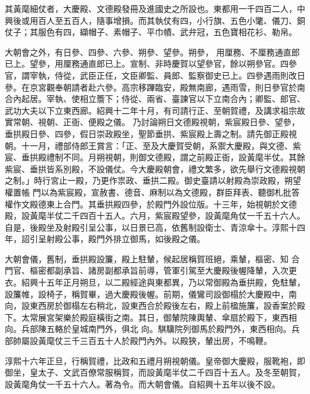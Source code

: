 \begin{pinyinscope}
 其黃麾細仗者，大慶殿、文德殿發冊及進國史之所設也。東都用一千四百二人，中興後或用百人至五百人，隨事增損。而其執仗有四，小行旗、五色小氅、儀刀、銅仗子；其服色有四，纈帽子、素帽子、平巾幘、武弁冠，五色寶相花衫、勒帛。



 大朝會之外，有日參、四參、六參、朔參、望參。朔參，
 用厘務、不厘務通直郎已上。望參，用厘務通直郎已上。宣制、非時慶賀以望參官，餘以朔參官。四參官，謂宰執，侍從，武臣正任，文臣卿監、員郎、監察御史已上。四參遇雨則改日參。在京宮觀奉朝請者赴六參。高宗移蹕臨安，殿無南廊，遇雨雪，則日參官於南合內起居。宰執、使相立簷下；侍從、兩省、臺諫官以下立南合內；卿監、郎官、武功大夫以下立東西廊。紹興十二年十月，有司請行正、至朝賀禮，及講求祖宗故實常朝、視朝、正衙、便殿之儀。
 乃討論朔日文德殿視朝，紫宸殿日參、望參，垂拱殿日參、四參，假日崇政殿坐，聖節垂拱、紫宸殿上壽之制。請先御正殿視朝。十一月，禮部侍郎王賞言：「正、至及大慶賀受朝，系禦大慶殿，與文德、紫宸、垂拱殿禮制不同。月朔視朝，則御文德殿，謂之前殿正衙，設黃麾半仗。其餘紫宸、垂拱皆系別殿，不設儀仗。今大慶殿朝會，禮文繁多，欲先舉行文德殿視朝之制。」時行宮止一殿，乃更作祟政、垂拱二殿。御史臺請以射殿為崇政殿，朔望權置帳
 門以為紫宸殿，宣赦書、德音、麻制以為文德殿，群臣拜表、聽御札批答權作文殿德東上合門。其垂拱殿四參，於殿門外設位版。十三年，始視朝於文德殿，設黃麾半仗二千四百十五人。六月，紫宸殿望參，設黃麾角仗一千五十六人。自是，後殿坐及射殿引呈公事，以日景已高，依舊制設衛士、青涼傘十。淳熙十四年，詔引呈射殿公事，殿門外排立御馬，如後殿之儀。



 大朝會儀，舊制，垂拱殿設簾，殿上駐輦，候起居稱賀班絕，乘輦，樞密、知
 合門官、樞密都副承旨、諸房副都承旨前導，管軍引駕至大慶殿後幄降輦，入次更衣。紹興十五年正月朔旦，以二殿經途與東都異，乃以常御殿為垂拱殿，免駐輦，設簾帷，設椅子，稱賀畢，過大慶殿後幄。前期，儀鸞司設御榻於大慶殿中，南向，設東西房於御榻左右稍北，設東西合於殿後左右，殿上前楹施簾，設香案於殿下。太常展宮架樂於殿庭橫街之南。其日，御輦院陳輿輦、傘扇於殿下，東西相向。兵部陳五輅於皇城南門外，俱北
 向。騏驥院列御馬於殿門外，東西相向。兵部帥屬設黃麾仗三千三百五十人於殿門內外。以殿狹，輦出房，不鳴鞭。



 淳熙十六年正旦，行稱賀禮，比政和五禮月朔視朝儀。皇帝御大慶殿，服靴袍，即御坐，皇太子、文武百僚常服稱賀，而設黃麾半仗二千四百十五人。及冬至朝賀，設黃麾角仗一千五十六人。著為令。而大朝會儀。自紹興十五年以後不設。



\end{pinyinscope}